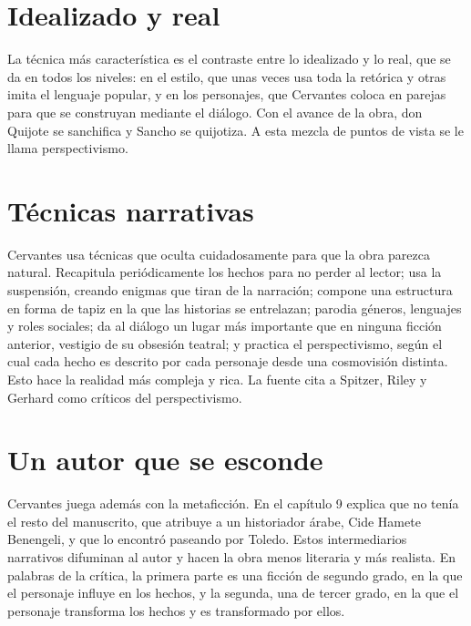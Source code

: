 \documentclass{book}
\begin{document}

\section{Idealizado y real}

La técnica más característica es el contraste entre lo idealizado y lo real, que se da en todos los niveles: en el estilo, que unas veces usa toda la retórica y otras imita el lenguaje popular, y en los personajes, que Cervantes coloca en parejas para que se construyan mediante el diálogo. Con el avance de la obra, don Quijote se sanchifica y Sancho se quijotiza. A esta mezcla de puntos de vista se le llama perspectivismo.


\section{Técnicas narrativas}

Cervantes usa técnicas que oculta cuidadosamente para que la obra parezca natural. Recapitula periódicamente los hechos para no perder al lector; usa la suspensión, creando enigmas que tiran de la narración; compone una estructura en forma de tapiz en la que las historias se entrelazan; parodia géneros, lenguajes y roles sociales; da al diálogo un lugar más importante que en ninguna ficción anterior, vestigio de su obsesión teatral; y practica el perspectivismo, según el cual cada hecho es descrito por cada personaje desde una cosmovisión distinta. Esto hace la realidad más compleja y rica. La fuente cita a Spitzer, Riley y Gerhard como críticos del perspectivismo.


\section{Un autor que se esconde}

Cervantes juega además con la metaficción. En el capítulo 9 explica que no tenía el resto del manuscrito, que atribuye a un historiador árabe, Cide Hamete Benengeli, y que lo encontró paseando por Toledo. Estos intermediarios narrativos difuminan al autor y hacen la obra menos literaria y más realista. En palabras de la crítica, la primera parte es una ficción de segundo grado, en la que el personaje influye en los hechos, y la segunda, una de tercer grado, en la que el personaje transforma los hechos y es transformado por ellos.
\end{document}
